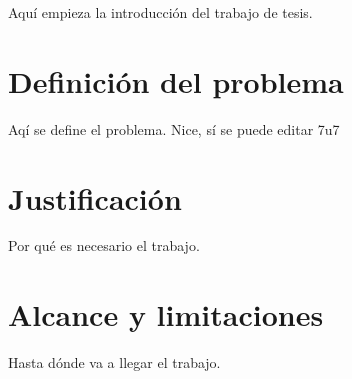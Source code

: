 Aquí empieza la introducci\'on del trabajo de tesis.

\section{Definición del problema}

Aq\'i se define el problema. Nice, s\'i se puede editar 7u7

\section{Justificaci\'on}

Por qué es necesario el trabajo.

\section{Alcance y limitaciones}

Hasta dónde va a llegar el trabajo.